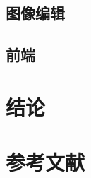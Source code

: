 \documentclass{article}
\begin{document}



\subsection{图像编辑}




\subsection{前端}




\section{结论}



\section*{参考文献}

\medskip

{\small


}
\end{document}
